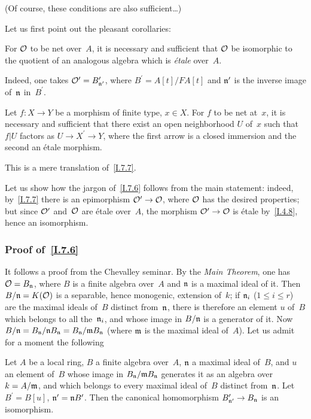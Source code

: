 (Of course, these conditions are also sufficient\ldots)

Let us first point out the pleasant corollaries:

\begin{corollary}
\label{I.7.7}
For $\cal{O}$ to be net over~$A$, it is necessary and sufficient
that $\cal{O}$ be isomorphic to the quotient of an analogous
algebra which is \emph{\'etale} over~$A$.
\end{corollary}

Indeed, one takes $\cal{O}^\prime=B^\prime_{\goth{n}^\prime}$,
where $B^\prime=A[t]/FA[t]$ and $\goth{n}^\prime$ is the inverse
image of~$\goth{n}$ in~$B^\prime$.

\begin{corollary}
\label{I.7.8}
Let
$f\colon X\to Y$ be a morphism of finite type, $x\in X$.
For $f$ to be net at~$x$, it is necessary and sufficient that
there exist an open neighborhood $U$ of~$x$ such that $f|U$
factors as $U\to X^\prime\to Y$, where the first arrow is
a closed immersion and the second an \'etale morphism.
\end{corollary}

This is a mere translation of~\ref{I.7.7}.

Let us show how the jargon of~\ref{I.7.6} follows from the
main statement: indeed, by~\ref{I.7.7} there is an epimorphism
$\cal{O}^\prime\to\cal{O}$, where $\cal{O}$ has the desired
properties; but since $\cal{O}^\prime$ and~$\cal{O}$ are \'etale
over~$A$, the morphism $\cal{O}^\prime\to\cal{O}$ is \'etale
by~\ref{I.4.8}, hence an isomorphism.

\subsubsection*{Proof of~\ref{I.7.6}}
It follows a proof from the Chevalley seminar. By the
\emph{Main Theorem}, one has $\cal{O}=B_{\goth{n}}$, where
$B$ is a finite algebra over~$A$ and $\goth{n}$ is a maximal
ideal of it. Then $B/\goth{n}=K(\cal{O})$ is a separable,
hence monogenic, extension of~$k$; if $\goth{n}_i$
($1\leq i\leq r$) are the maximal ideals of~$B$ distinct
from~$\goth{n}$, there is therefore an element $u$ of~$B$
which belongs to all the~$\goth{n}_i$, and whose image in
$B/\goth{n}$ is a generator of it. Now
$B/\goth{n}=B_\goth{n}/\goth{n}B_\goth{n}
=B_\goth{n}/\goth{m}B_\goth{n}$ (where $\goth{m}$ is the
maximal ideal of~$A$). Let us admit for a moment the following

\begin{lemma}
\label{I.7.9}
Let $A$ be a local ring, $B$ a finite algebra over~$A$,
$\goth{n}$ a maximal ideal of~$B$, and $u$ an element of~$B$
whose image in $B_\goth{n}/\goth{m}B_\goth{n}$ generates it
as an algebra over~$k=A/\goth{m}$, and which belongs to every
maximal ideal of~$B$ distinct from~$\goth{n}$. Let
$B^\prime=B[u]$, $\goth{n}^\prime=\goth{n}B^\prime$.
Then the canonical homomorphism
$B^\prime_{\goth{n}^\prime}\to B_\goth{n}$ is an isomorphism.
\end{lemma}

